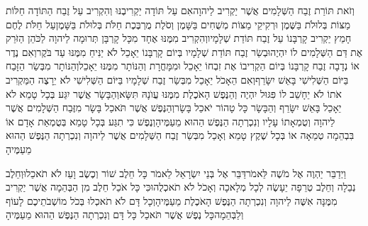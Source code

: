 \documentclass[../main/main.tex]{subfiles}
\begin{document}
\begin{multicols*}{\ncols}
וְזֹאת תּוֹרַת זֶבַח הַשְּׁלָמִים אֲשֶׁר יַקְרִיב לַיהוָה\PreVerseSpace{}אִם עַל תּוֹדָה יַקְרִיבֶנּוּ וְהִקְרִיב עַל זֶבַח הַתּוֹדָה חַלּוֹת מַצּוֹת בְּלוּלֹת בַּשֶּׁמֶן וּרְקִיקֵי מַצּוֹת מְשֻׁחִים בַּשָּׁמֶן וְסֹלֶת מֻרְבֶּכֶת חַלֹּת בְּלוּלֹת בַּשָּׁמֶן\PreVerseSpace{}עַל חַלֹּת לֶחֶם חָמֵץ יַקְרִיב קָרְבָּנוֹ עַל זֶבַח תּוֹדַת שְׁלָמָיו\PreVerseSpace{}וְהִקְרִיב מִמֶּנּוּ אֶחָד מִכָּל קָרְבָּן תְּרוּמָה לַיהוָה לַכֹּהֵן הַזֹּרֵק אֶת דַּם הַשְּׁלָמִים לוֹ יִהְיֶה\PreVerseSpace{}וּבְשַׂר זֶבַח תּוֹדַת שְׁלָמָיו בְּיוֹם קָרְבָּנוֹ יֵאָכֵל לֹא יַנִּיחַ מִמֶּנּוּ עַד בֹּקֶר\PreVerseSpace{}וְאִם נֶדֶר אוֹ נְדָבָה זֶבַח קָרְבָּנוֹ בְּיוֹם הַקְרִיבוֹ אֶת זִבְחוֹ יֵאָכֵל וּמִמָּחֳרָת וְהַנּוֹתָר מִמֶּנּוּ יֵאָכֵל\PreVerseSpace{}וְהַנּוֹתָר מִבְּשַׂר הַזָּבַח בַּיּוֹם הַשְּׁלִישִׁי בָּאֵשׁ יִשָּׂרֵף\PreVerseSpace{}וְאִם הֵאָכֹל יֵאָכֵל מִבְּשַׂר זֶבַח שְׁלָמָיו בַּיּוֹם הַשְּׁלִישִׁי לֹא יֵרָצֶה הַמַּקְרִיב אֹתוֹ לֹא יֵחָשֵׁב לוֹ פִּגּוּל יִהְיֶה וְהַנֶּפֶשׁ הָאֹכֶלֶת מִמֶּנּוּ עֲוֺנָהּ תִּשָּׂא\PreVerseSpace{}וְהַבָּשָׂר אֲשֶׁר יִגַּע בְּכָל טָמֵא לֹא יֵאָכֵל בָּאֵשׁ יִשָּׂרֵף וְהַבָּשָׂר כָּל טָהוֹר יֹאכַל בָּשָׂר\PreVerseSpace{}וְהַנֶּפֶשׁ אֲשֶׁר תֹּאכַל בָּשָׂר מִזֶּבַח הַשְּׁלָמִים אֲשֶׁר לַיהוָה וְטֻמְאָתוֹ עָלָיו וְנִכְרְתָה הַנֶּפֶשׁ הַהוּא מֵעַמֶּיהָ\PreVerseSpace{}וְנֶפֶשׁ כִּי תִגַּע בְּכָל טָמֵא בְּטֻמְאַת אָדָם אוֹ בִּבְהֵמָה טְמֵאָה אוֹ בְּכָל שֶׁקֶץ טָמֵא וְאָכַל מִבְּשַׂר זֶבַח הַשְּׁלָמִים אֲשֶׁר לַיהוָה וְנִכְרְתָה הַנֶּפֶשׁ הַהוּא מֵעַמֶּיהָ\OpenSection{}\par
{}וַיְדַבֵּר יַהְוֶה אֶל מֹשֶׁה לֵּאמֹר\PreVerseSpace{}דַּבֵּר אֶל בְּנֵי יִשְׂרָאֵל לֵאמֹר כָּל חֵלֶב שׁוֹר וְכֶשֶׂב וָעֵז לֹא תֹאכֵלוּ\PreVerseSpace{}וְחֵלֶב נְבֵלָה וְחֵלֶב טְרֵפָה יֵעָשֶׂה לְכָל מְלָאכָה וְאָכֹל לֹא תֹאכְלֻהוּ\PreVerseSpace{}כִּי כָּל אֹכֵל חֵלֶב מִן הַבְּהֵמָה אֲשֶׁר יַקְרִיב מִמֶּנָּה אִשֶּׁה לַיהוָה וְנִכְרְתָה הַנֶּפֶשׁ הָאֹכֶלֶת מֵעַמֶּיהָ\PreVerseSpace{}וְכָל דָּם לֹא תֹאכְלוּ בְּכֹל מוֹשְׁבֹתֵיכֶם לָעוֹף וְלַבְּהֵמָה\PreVerseSpace{}כָּל נֶפֶשׁ אֲשֶׁר תֹּאכַל כָּל דָּם וְנִכְרְתָה הַנֶּפֶשׁ הַהוּא מֵעַמֶּיהָ\OpenSection{}\par

\end{multicols*}
\end{document}
